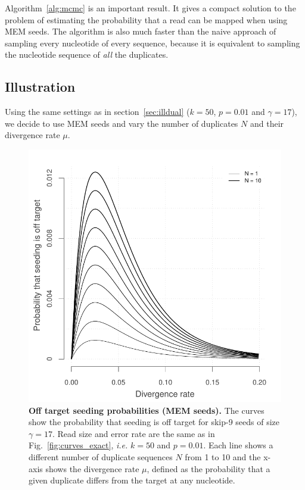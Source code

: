 \documentclass{article}
\begin{document}
Algorithm~\ref{alg:mcmc} is an important result. It gives a compact
solution to the problem of estimating the probability that a read can be
mapped when using MEM seeds. The algorithm is also much faster than the
naive approach of sampling every nucleotide of every sequence, because it
is equivalent to sampling the nucleotide sequence of \emph{all} the
duplicates.

\subsection{Illustration}
\label{sec:illmem}

Using the same settings as in section~\ref{sec:illdual} ($k=50$, $p=0.01$
and $\gamma=17$), we decide to use MEM seeds and vary the number of
duplicates $N$ and their divergence rate $\mu$.

\begin{figure}[h]
\centering
\includegraphics[scale=0.65]{curves_mem.pdf}
\caption{\textbf{Off target seeding probabilities (MEM seeds).}
The curves show the probability that seeding is off target for skip-9
seeds of size $\gamma=17$. Read size and error rate are the same as in
Fig.~\ref{fig:curves_exact}, \textit{i.e.} $k=50$ and $p=0.01$. Each line
shows a different number of duplicate sequences $N$ from 1 to 10 and the
x-axis shows the divergence rate $\mu$, defined as the probability that a
given duplicate differs from the target at any nucleotide.}
\label{fig:curves_mem}
\end{figure}
\end{document}
